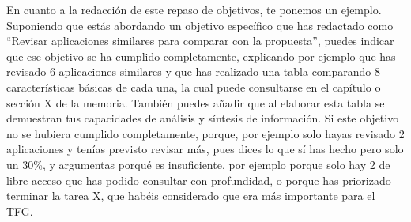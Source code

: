  En cuanto a la redacción de este repaso de objetivos, te ponemos un ejemplo. Suponiendo que estás abordando un objetivo específico que has redactado como ``Revisar aplicaciones similares para comparar con la propuesta'', puedes indicar que ese objetivo se ha cumplido completamente, explicando por ejemplo que has revisado 6 aplicaciones similares y que has realizado una tabla comparando 8 características básicas de cada una, la cual puede consultarse en el capítulo o sección X de la memoria. También puedes añadir que al elaborar esta tabla se demuestran tus capacidades de análisis y síntesis de información. Si este objetivo no se hubiera cumplido completamente, porque, por ejemplo solo hayas revisado 2 aplicaciones y tenías previsto revisar más, pues dices lo que sí has hecho pero solo un 30\%, y argumentas porqué es insuficiente, por ejemplo porque solo hay 2 de libre acceso que has podido consultar con profundidad, o porque has priorizado terminar la tarea X, que habéis considerado que era más importante para el TFG. 

 
